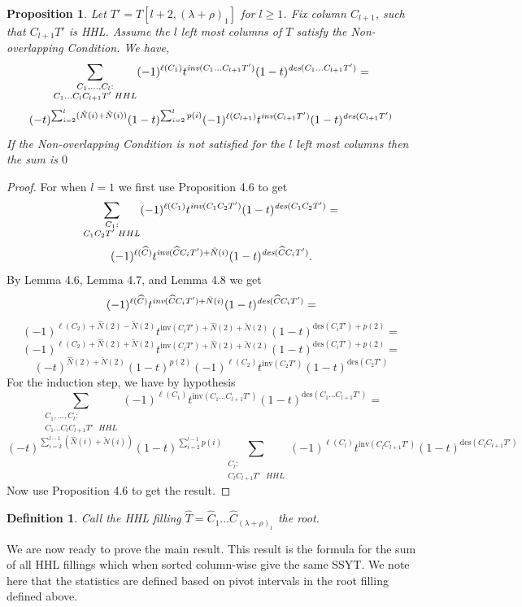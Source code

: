\documentclass[11pt]{amsart}
\newtheorem{prop}{Proposition}[section]
\newtheorem{definition}{Definition}[section]
\begin{document}
{\begin{prop} 
Let $T'=T[l+2,(\lambda+\rho)_{1}]$ for $l \geq 1$. Fix column $C_{l+1}$, such that $C_{l+1}T'$ is HHL. Assume the $l$ left most columns of $T$ satisfy the Non-overlapping Condition. We have,
\[
\sum_{\substack{C_{1}, \ldots, C_{l}: \\ C_{1}\ldots C_{l}C_{l+1}T'\text{ } HHL}}(-1)^{\ell(C_{1})}t^{\emph{inv}(C_{1}\ldots C_{l+1}T')}(1-t)^{\emph{des}(C_{1}\ldots C_{l+1}T')}=
\]
\[
(-t)^{\sum_{i=2}^{l}(\hat{N}(i)+\check{N}(i))}(1-t)^{\sum_{i=2}^{l}p(i)}(-1)^{\ell({C}_{l+1})}t^{\emph{inv}(C_{l+1}T')}(1-t)^{\emph{des}(C_{l+1}T')}
\]
If the Non-overlapping Condition is not satisfied for the $l$ left most columns then the sum is $0$
\end{prop}
\begin{proof}
For when $l=1$ we first use Proposition 4.6 to get 
\[
\sum_{\substack{C_{1}: \\ C_{1}C_{2}T'\text{ } HHL}}(-1)^{\ell(C_{1})}t^{\emph{inv}(C_{1}C_{2}T')}(1-t)^{\emph{des}(C_{1}C_{2}T')}=
\]
\[
(-1)^{\ell(\widehat{C})}t^{\emph{inv}(\widehat{C}C_{i}T')+\check{N}(i)}(1-t)^{\emph{des}(\widehat{C}C_{i}T')}.
\]
By Lemma 4.6, Lemma 4.7, and Lemma 4.8 we get 
\[
(-1)^{\ell(\widehat{C})}t^{\emph{inv}(\widehat{C}C_{i}T')+\check{N}(i)}(1-t)^{\emph{des}(\widehat{C}C_{i}T')}=
\]
\[
(-1)^{\ell(C_{2})+\hat{N}(2)-\check{N}(2)}t^{\text{inv}(C_{i}T')+\hat{N}(2)+\check{N}(2)}(1-t)^{\text{des}(C_{i}T')+p(2)}=
\]
\[
(-1)^{\ell(C_{2})+\hat{N}(2)+\check{N}(2)}t^{\text{inv}(C_{i}T')+\hat{N}(2)+\check{N}(2)}(1-t)^{\text{des}(C_{i}T')+p(2)}=
\]
\[
(-t)^{\hat{N}(2)+\check{N}(2)}(1-t)^{p(2)}(-1)^{\ell(C_{2})}t^{\text{inv}(C_{2}T')}(1-t)^{\text{des}(C_{2}T')}
\]
\indent For the induction step, we have by hypothesis
\[
\sum_{\substack{C_{1}, \ldots, C_{l}: \\ C_{1}\ldots C_{l}C_{l+1}T'\text{ } HHL}}(-1)^{\ell(C_{1})}t^{\text{inv}(C_{1}\ldots C_{l+1}T')}(1-t)^{\text{des}(C_{1}\ldots C_{l+1}T')}=
\]
\[
(-t)^{\sum_{i=2}^{l-1}(\hat{N}(i)+\check{N}(i))}(1-t)^{\sum_{i=2}^{l-1}p(i)}\sum_{\substack{C_{l}: \\ C_{l}C_{l+1}T'\text{ } HHL}}(-1)^{\ell(C_{l})}t^{\text{inv}(C_{l}C_{l+1}T')}(1-t)^{\text{des}(C_{l}C_{l+1}T')}
\]
Now use Proposition 4.6 to get the result. 
\end{proof}
\begin{definition}
Call the HHL filling $\widehat{T}=\widehat{C}_{1}\ldots \widehat{C}_{(\lambda+\rho)_{1}}$ the 
\emph{root}. 
\end{definition}
We are now ready to prove the main result. This result is the formula for the sum of all HHL fillings which when sorted column-wise give the same SSYT. We note here that the statistics are defined based on pivot intervals in the root filling defined above.  
}
\end{document}
